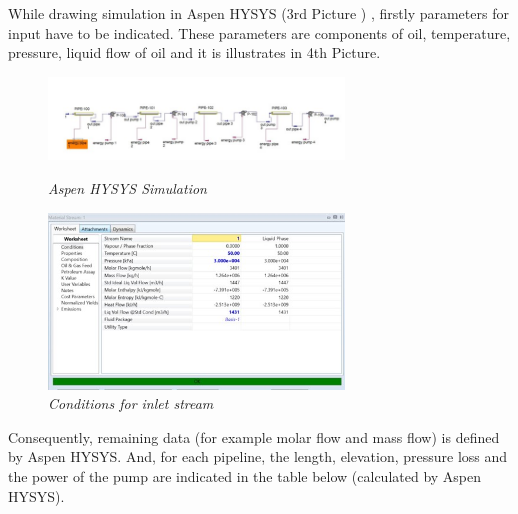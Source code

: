 \documentclass[12pt]{article}
\begin{document}
 {\fontsize{12pt}{12pt}\selectfont 
 While drawing simulation in Aspen HYSYS (3rd  Picture ) , firstly parameters for input have to be indicated. These parameters are components of oil, temperature, pressure, liquid flow of oil and it is illustrates in 4th Picture.
\\

}

\begin{figure}[H]
	\centering
	\includegraphics[width=0.7\textwidth]{assets/images/some_pipe_stuff.jpg}
	\caption{\textit{Aspen HYSYS Simulation} }

	\vspace{10mm}

	\includegraphics[width=0.7\textwidth]{assets/images/inlet.jpg}
	\caption{\textit{Conditions for inlet stream}}
	
 \end{figure}
 

{\fontsize{12pt}{12pt}\selectfont
Consequently, remaining data (for example molar flow and mass flow) is defined by Aspen HYSYS. And, for each pipeline, the length, elevation, pressure loss and the power of the pump are indicated in the table below (calculated by Aspen HYSYS). 
\\


}
\end{document}

